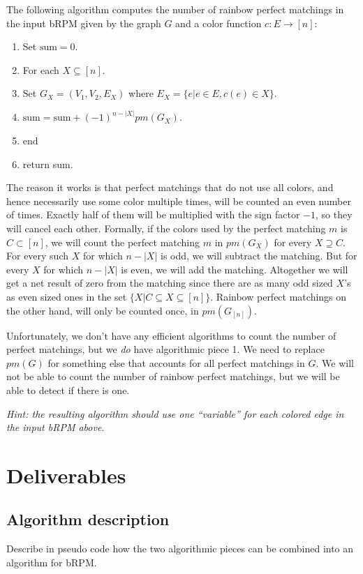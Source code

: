\documentclass{tufte-handout}
\begin{document}
 The following algorithm computes the number of rainbow perfect matchings in the input bRPM given by the graph $G$ and a
color function $c:E\rightarrow [n]$:

\begin{enumerate}
\item Set $\mbox{sum}=0$.
\item For each $X\subseteq [n]$.
\item \hspace{5mm} Set $G_X=(V_1,V_2,E_X)$ where $E_X=\{e|e\in E, c(e)\in X\}$.
\item \hspace{5mm} $\mbox{sum}=\mbox{sum}+(-1)^{n-|X|}pm(G_X)$.
\item end
\item return \mbox{sum}.
\end{enumerate}

The reason it works is that perfect matchings that do not use all colors, and hence necessarily use some color multiple times, will be counted an even number of times. Exactly half of them will be multiplied with the sign factor $-1$, so they will cancel each other. Formally, if the colors used by the perfect matching $m$ is $C\subset [n]$, we will count the perfect matching $m$ in $pm(G_X)$ for every $X\supseteq C$. For every such $X$ for which $n-|X|$ is odd, we will subtract the matching. But for every $X$ for which $n-|X|$ is even, we will add the matching. Altogether we will get a net result of zero from the matching since there are as many odd sized $X$'s as even sized ones in the set  $\{X|C\subseteq X \subseteq [n]\}$. Rainbow perfect matchings on the other hand, will only be counted once, in $pm(G_{[n]})$.

\bigskip
Unfortunately, we don't have any efficient algorithms to count the number of perfect matchings, but we \emph{do} have algorithmic piece 1.  We need to replace $pm(G)$ for something else that accounts for all perfect matchings in $G$. We will not be able to count the number of rainbow perfect matchings, but we will be able to detect if there is one.

\noindent \emph{Hint: the resulting algorithm should use one ``variable'' for each colored edge in the input bRPM above}.

\section*{Deliverables}
\subsection*{Algorithm description}
Describe in pseudo code how the two algorithmic pieces can be combined into an algorithm for bRPM.
\end{document}
